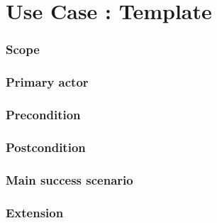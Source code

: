 \section{Use Case : Template}

\subsubsection{Scope}

\subsubsection{Primary actor}

\subsubsection{Precondition}

\subsubsection{Postcondition}

\subsubsection{Main success scenario}

\subsubsection{Extension}

